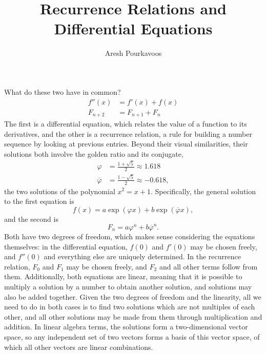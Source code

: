 \documentclass{article}
\begin{document}
\title{Recurrence Relations and Differential Equations}
\author{Aresh Pourkavoos}
\maketitle

What do these two have in common?
\begin{align*}
  f''(x) &= f'(x)+f(x) \\
  F_{n+2} &= F_{n+1}+F_n
\end{align*}
The first is a differential equation,
which relates the value of a function to its derivatives,
and the other is a recurrence relation,
a rule for building a number sequence by looking at previous entries.
Beyond their visual similarities,
their solutions both involve the golden ratio and its conjugate,
\begin{align*}
  \varphi &= \frac{1+\sqrt{5}}{2} \approx 1.618 \\
  \overline{\varphi} &= \frac{1-\sqrt{5}}{2} \approx -0.618,
\end{align*}
the two solutions of the polynomial
$x^2=x+1$.
Specifically, the general solution to the first equation is
\[f(x) = a\exp(\varphi x)+b\exp(\overline{\varphi}x),\]
and the second is
\[F_n = a\varphi^n+b\overline{\varphi}^n.\]
Both have two degrees of freedom,
which makes sense considering the equations themselves:
in the differential equation,
$f(0)$ and $f'(0)$ may be chosen freely,
and $f''(0)$ and everything else are uniquely determined.
In the recurrence relation,
$F_0$ and $F_1$ may be chosen freely,
and $F_2$ and all other terms follow from them.
Additionally, both equations are linear,
meaning that it is possible to multiply a solution by a number
to obtain another solution,
and solutions may also be added together.
Given the two degrees of freedom
and the linearity,
all we need to do in both cases
is to find two solutions
which are not multiples of each other,
and all other solutions may be made from them
through multiplication and addition.
In linear algebra terms,
the solutions form a two-dimensional vector space,
so any independent set of two vectors
forms a basis of this vector space,
of which all other vectors are linear combinations.



\end{document}
